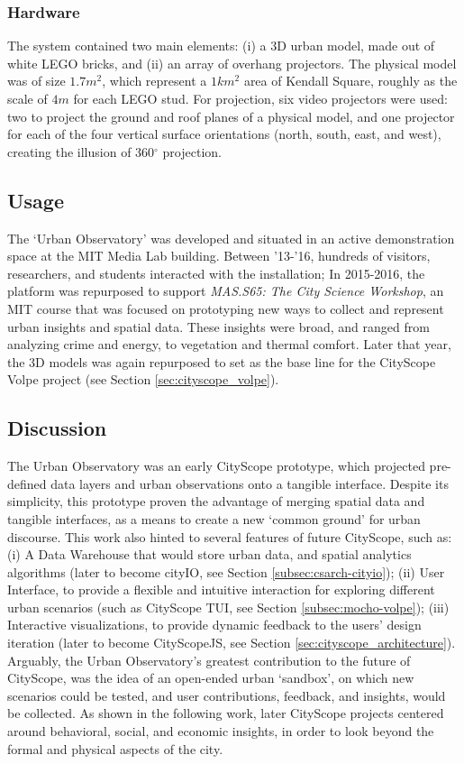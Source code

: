{{      \subsubsection{Hardware}
      {
          The system contained two main elements: (i) a 3D urban model, made out of white LEGO bricks, and (ii) an array of overhang projectors. The physical model was of size $1.7m^2$, which represent a $1km^2$ area of Kendall Square, roughly as the scale of $4m$ for each LEGO stud. For projection, six video projectors were used: two to project the ground and roof planes of a physical model, and one projector for each of the four vertical surface orientations (north, south, east, and west), creating the illusion of 360$^{\circ}$ projection.
      }
  }

  \subsection{Usage}
  {
      The `Urban Observatory' was developed and situated in an active demonstration space at the MIT Media Lab building. Between '13-'16, hundreds of visitors, researchers, and students interacted with the installation; In 2015-2016, the platform was repurposed to support \textit{MAS.S65: The City Science Workshop}, an MIT course that was focused on prototyping new ways to collect and represent urban insights and spatial data. These insights were broad, and ranged from analyzing crime and energy, to vegetation and thermal comfort. Later that year, the 3D models was again repurposed to set as the base line for the CityScope Volpe project (see Section \eqref{sec:cityscope_volpe}).
  }

  \subsection{Discussion}{\label{subsec:observatory_discussion}}

  {
      The Urban Observatory was an early CityScope prototype, which projected pre-defined data layers and urban observations onto a tangible interface. Despite its simplicity, this prototype proven the advantage of merging spatial data and tangible interfaces, as a means to create a new `common ground' for urban discourse. This work also hinted to several features of future CityScope, such as: (i) A Data Warehouse that would store urban data, and spatial analytics algorithms (later to become cityIO, see Section \eqref{subsec:csarch-cityio}); (ii) User Interface, to provide a flexible and intuitive interaction for exploring different urban scenarios (such as CityScope TUI, see Section \eqref{subsec:mocho-volpe}); (iii) Interactive visualizations, to provide dynamic feedback to the users' design iteration (later to become CityScopeJS, see Section \eqref{sec:cityscope_architecture}). Arguably, the Urban Observatory's greatest contribution to the future of CityScope, was the idea of an open-ended urban `sandbox', on which new scenarios could be tested, and user contributions, feedback, and insights, would be collected.
      \newline
      As shown in the following work, later CityScope projects centered around behavioral, social, and economic insights, in order to look beyond the formal and physical aspects of the city.
  }
 }